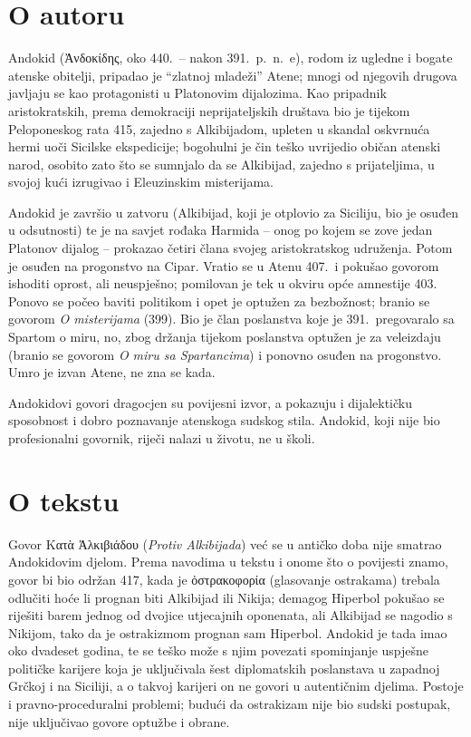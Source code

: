 \section*{O autoru}

Andokid (Ἀνδοκίδης, oko 440.\ – nakon 391.\ p.~n.~e), rodom iz ugledne i bogate atenske obitelji, pripadao je ``zlatnoj mladeži'' Atene; mnogi od njegovih drugova javljaju se kao protagonisti u Platonovim dijalozima. Kao pripadnik aristokratskih, prema demokraciji neprijateljskih društava bio je tijekom Peloponeskog rata 415, zajedno s Alkibijadom, upleten u skandal oskvrnuća hermi uoči Sicilske ekspedicije; bogohulni je čin teško uvrijedio običan atenski narod, osobito zato što se sumnjalo da se Alkibijad, zajedno s prijateljima, u svojoj kući izrugivao i Eleuzinskim misterijama.

Andokid je završio u zatvoru (Alkibijad, koji je otplovio za Siciliju, bio je osuđen u odsutnosti) te je na savjet rođaka Harmida – onog po kojem se zove jedan Platonov dijalog – prokazao četiri člana svojeg aristokratskog udruženja. Potom je osuđen na progonstvo na Cipar. Vratio se u Atenu 407.\ i pokušao govorom ishoditi oprost, ali neuspješno; pomilovan je tek u okviru opće amnestije 403. Ponovo se počeo baviti politikom i opet je optužen za bezbožnost; branio se govorom \textit{O misterijama} (399). Bio je član poslanstva koje je 391.\ pregovaralo sa Spartom o miru, no, zbog držanja tijekom poslanstva optužen je za veleizdaju (branio se govorom \textit{O miru sa Spartancima}) i ponovno osuđen na progonstvo. Umro je izvan Atene, ne zna se kada.

Andokidovi govori dragocjen su povijesni izvor, a pokazuju i dijalektičku sposobnost i dobro poznavanje atenskoga sudskog stila. Andokid, koji nije bio profesionalni govornik, riječi nalazi u životu, ne u školi.

\section*{O tekstu}

Govor Κατὰ Ἀλκιβιάδου (\textit{Protiv Alkibijada}) već se u antičko doba nije smatrao Andokidovim djelom. Prema navodima u tekstu i onome što o povijesti znamo, govor bi bio održan 417, kada je ὀστρακοφορία (glasovanje ostrakama) trebala odlučiti hoće li prognan biti Alkibijad ili Nikija; demagog Hiperbol pokušao se riješiti barem jednog od dvojice utjecajnih oponenata, ali Alkibijad se nagodio s Nikijom, tako da je ostrakizmom prognan sam Hiperbol. Andokid je tada imao oko dvadeset godina, te se teško može s njim povezati spominjanje uspješne političke karijere koja je uključivala šest diplomatskih poslanstava u zapadnoj Grčkoj i na Siciliji, a o takvoj karijeri on ne govori u autentičnim djelima. Postoje i pravno-proceduralni problemi; budući da ostrakizam nije bio sudski postupak, nije uključivao govore optužbe i obrane.

